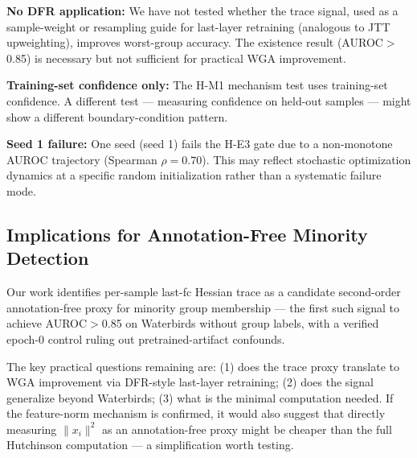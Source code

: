 \textbf{No DFR application:} We have not tested whether the trace signal, used as a sample-weight or resampling guide for last-layer retraining (analogous to JTT upweighting), improves worst-group accuracy. The existence result (AUROC$>$0.85) is necessary but not sufficient for practical WGA improvement.

\textbf{Training-set confidence only:} The H-M1 mechanism test uses training-set confidence. A different test --- measuring confidence on held-out samples --- might show a different boundary-condition pattern.

\textbf{Seed 1 failure:} One seed (seed 1) fails the H-E3 gate due to a non-monotone AUROC trajectory (Spearman $\rho{=}0.70$). This may reflect stochastic optimization dynamics at a specific random initialization rather than a systematic failure mode.

\subsection{Implications for Annotation-Free Minority Detection}

Our work identifies per-sample last-fc Hessian trace as a candidate second-order annotation-free proxy for minority group membership --- the first such signal to achieve AUROC$>$0.85 on Waterbirds without group labels, with a verified epoch-0 control ruling out pretrained-artifact confounds.

The key practical questions remaining are: (1) does the trace proxy translate to WGA improvement via DFR-style last-layer retraining; (2) does the signal generalize beyond Waterbirds; (3) what is the minimal computation needed. If the feature-norm mechanism is confirmed, it would also suggest that directly measuring $\|x_i\|^2$ as an annotation-free proxy might be cheaper than the full Hutchinson computation --- a simplification worth testing.
